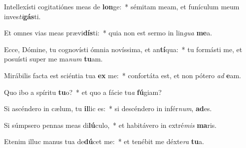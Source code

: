 \item Intellexísti cogitatiónes meas de \textbf{lon}ge:~* sémitam meam, et funículum meum inves\textit{ti}\textbf{gás}ti.
\item Et omnes vias meas prævi\textbf{dís}ti:~* quia non est sermo in lin\textit{gua} \textbf{me}a.
\item Ecce, Dómine, tu cognovísti ómnia novíssima, et an\textbf{tí}qua:~* tu formásti me, et posuísti super me ma\textit{num} \textbf{tu}am.
\item Mirábilis facta est sciéntia tua \textbf{ex} me:~* confortáta est, et non pótero \textit{ad} \textbf{e}am.
\item Quo ibo a spíritu \textbf{tu}o?~* et quo a fácie tu\textit{a} \textbf{fú}giam?
\item Si ascéndero in cælum, tu \textbf{il}lic es:~* si descéndero in infér\textit{num}, \textbf{ad}es.
\item Si súmpsero pennas meas di\textbf{lú}culo,~* et habitávero in extré\textit{mis} \textbf{ma}ris.
\item Etenim illuc manus tua de\textbf{dú}cet me:~* et tenébit me déxte\textit{ra} \textbf{tu}a.
